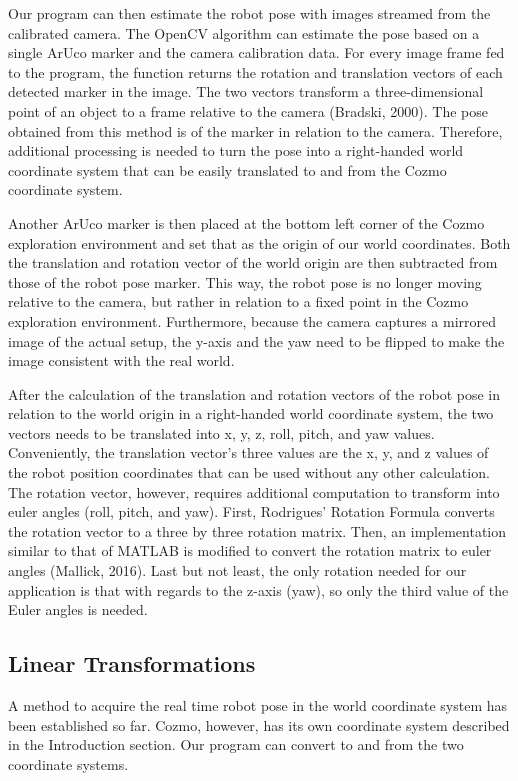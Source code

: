 \documentclass[jou,apacite]{apa6}
\begin{document}
Our program can then estimate the robot pose with images streamed from the calibrated camera. The OpenCV algorithm can estimate the pose based on a single ArUco marker and the camera calibration data. For every image frame fed to the program, the function returns the rotation and translation vectors of each detected marker in the image. The two vectors transform a three-dimensional point of an object to a frame relative to the camera (Bradski, 2000). The pose obtained from this method is of the marker in relation to the camera. Therefore, additional processing is needed to turn the pose into a right-handed world coordinate system that can be easily translated to and from the Cozmo coordinate system.

Another ArUco marker is then placed at the bottom left corner of the Cozmo exploration environment and set that as the origin of our world coordinates. Both the translation and rotation vector of the world origin are then subtracted from those of the robot pose marker. This way, the robot pose is no longer moving relative to the camera, but rather in relation to a fixed point in the Cozmo exploration environment. Furthermore, because the camera captures a mirrored image of the actual setup, the y-axis and the yaw need to be flipped to make the image consistent with the real world.

After the calculation of the translation and rotation vectors of the robot pose in relation to the world origin in a right-handed world coordinate system, the two vectors needs to be translated into x, y, z, roll, pitch, and yaw values. Conveniently, the translation vector’s three values are the x, y, and z values of the robot position coordinates that can be used without any other calculation. The rotation vector, however, requires additional computation to transform into euler angles (roll, pitch, and yaw). First, Rodrigues' Rotation Formula converts the rotation vector to a three by three rotation matrix. Then, an implementation similar to that of MATLAB is modified to convert the rotation matrix to euler angles (Mallick, 2016). Last but not least, the only rotation needed for our application is that with regards to the z-axis (yaw), so only the third value of the Euler angles is needed.


\subsection{Linear Transformations}
A method to acquire the real time robot pose in the world coordinate system has been established so far. Cozmo, however, has its own coordinate system described in the Introduction section. Our program can convert to and from the two coordinate systems.
\end{document}
